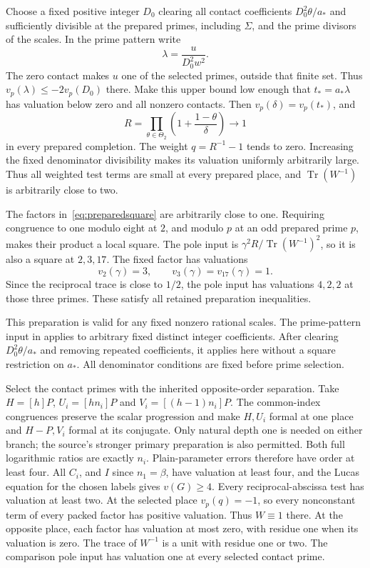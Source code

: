 \documentclass[11pt,a4paper]{article}
\DeclareMathOperator{\Tr}{Tr}\DeclareMathOperator{\Nm}{Nm}
\begin{document}
Choose a fixed positive integer $D_0$ clearing all contact coefficients
$D_0^2\theta/a_*$ and sufficiently divisible at the prepared primes,
including $\Sigma$, and the prime divisors of the scales. In the prime
pattern write
\[
                         \lambda=\frac{u}{D_0^2w^2}.
\]
The zero contact makes $u$ one of the selected primes, outside that
finite set. Thus $v_p(\lambda)\le-2v_p(D_0)$ there. Make this upper
bound low enough that $t_*=a_*\lambda$ has valuation below zero and
all nonzero contacts. Then $v_p(\delta)=v_p(t_*)$, and
\begin{equation}\label{eq:preparedsquare}
 R=\prod_{\theta\in\Theta_2}
                 \left(1+\frac{1-\theta}{\delta}\right)
       \longrightarrow1
\end{equation}
in every prepared completion. The weight $q=R^{-1}-1$ tends to zero.
Increasing the fixed denominator divisibility makes its valuation
uniformly arbitrarily large. Thus all weighted test terms are small
at every prepared place, and $\Tr(W^{-1})$ is arbitrarily close to two.

The factors in~\eqref{eq:preparedsquare} are arbitrarily close to one.
Requiring congruence to one modulo eight at $2$, and modulo $p$ at an odd
prepared prime $p$, makes their product a local square. The pole input
is $\gamma^2R/\Tr(W^{-1})^2$, so it is also a square at $2,3,17$.
The fixed factor has valuations
\[
 v_2(\gamma)=3,\qquad v_3(\gamma)=v_{17}(\gamma)=1.
\]
Since the reciprocal trace is close to $1/2$, the pole input has
valuations $4,2,2$ at those three primes. These satisfy all retained
preparation inequalities.

This preparation is valid for any fixed nonzero rational scales.
The prime-pattern input in \cite{Selection,Dependencies} applies to
arbitrary fixed distinct integer coefficients. After clearing
$D_0^2\theta/a_*$ and removing repeated coefficients, it applies
here without a square restriction on $a_*$. All denominator
conditions are fixed before prime selection.

Select the contact primes with the inherited opposite-order separation.
Take $H=[h]P$, $U_i=[hn_i]P$ and $V_i=[(h-1)n_i]P$.
The common-index congruences preserve the scalar progression and make
$H,U_i$ formal at one place and $H-P,V_i$ formal at its conjugate.
Only natural depth one is needed on either branch; the source's stronger
primary preparation is also permitted. Both full logarithmic ratios
are exactly $n_i$. Plain-parameter errors therefore have order at least
four. All $C_i$, and $I$ since $n_1=\beta$, have valuation at least four,
and the Lucas equation for the chosen labels gives $v(G)\ge4$.
Every reciprocal-abscissa test has valuation at least two.
At the selected place $v_p(q)=-1$, so every nonconstant term of every
packed factor has positive valuation. Thus $W\equiv1$ there. At the
opposite place, each factor has valuation at most zero, with residue one
when its valuation is zero. The trace of $W^{-1}$ is a unit with residue
one or two. The comparison pole input has valuation one at every
selected contact prime.
\end{document}
